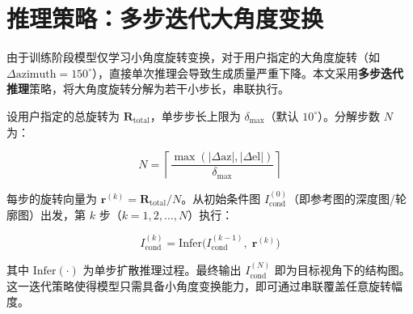 \section{推理策略：多步迭代大角度变换}
\label{sec:multi_step}

由于训练阶段模型仅学习小角度旋转变换，对于用户指定的大角度旋转（如 $\Delta\text{azimuth} = 150^\circ$），直接单次推理会导致生成质量严重下降。本文采用\textbf{多步迭代推理}策略，将大角度旋转分解为若干小步长，串联执行。

设用户指定的总旋转为 $\mathbf{R}_{\text{total}}$，单步步长上限为 $\delta_{\max}$（默认 $10^\circ$）。分解步数 $N$ 为：

\begin{equation}
    N = \left\lceil \frac{\max(|\Delta\text{az}|, |\Delta\text{el}|)}{\delta_{\max}} \right\rceil
\end{equation}

每步的旋转向量为 $\mathbf{r}^{(k)} = \mathbf{R}_{\text{total}} / N$。从初始条件图 $I_{\text{cond}}^{(0)}$（即参考图的深度图/轮廓图）出发，第 $k$ 步（$k = 1, 2, \dots, N$）执行：

\begin{equation}
    I_{\text{cond}}^{(k)} = \text{Infer}\bigl(I_{\text{cond}}^{(k-1)},\; \mathbf{r}^{(k)}\bigr)
\end{equation}

其中 $\text{Infer}(\cdot)$ 为单步扩散推理过程。最终输出 $I_{\text{cond}}^{(N)}$ 即为目标视角下的结构图。这一迭代策略使得模型只需具备小角度变换能力，即可通过串联覆盖任意旋转幅度。
